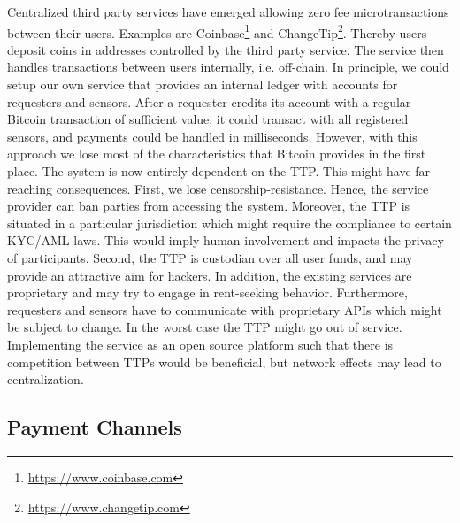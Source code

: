 Centralized third party services have emerged allowing zero fee microtransactions between their users. Examples are Coinbase\footnote{\url{https://www.coinbase.com}} and ChangeTip\footnote{\url{https://www.changetip.com}}. Thereby users deposit coins in addresses controlled by the third party service. The service then handles transactions between users internally, i.e. off-chain. In principle, we could setup our own service that provides an internal ledger with accounts for requesters and sensors. After a requester credits its account with a regular Bitcoin transaction of sufficient value, it could transact with all registered sensors, and payments could be handled in milliseconds. However, with this approach we lose most of the characteristics that Bitcoin provides in the first place. The system is now entirely dependent on the \ac{TTP}. This might have far reaching consequences. First, we lose censorship-resistance. Hence, the service provider can ban parties from accessing the system. Moreover, the \ac{TTP} is situated in a particular jurisdiction which might require the compliance to certain \ac{KYC}/\ac{AML} laws. This would imply human involvement and impacts the privacy of participants. Second, the \ac{TTP} is custodian over all user funds, and may provide an attractive aim for hackers. In addition, the existing services are proprietary and may try to engage in rent-seeking behavior. Furthermore, requesters and sensors have to communicate with proprietary \ac{API}s which might be subject to change. In the worst case the \ac{TTP} might go out of service. Implementing the service as an open source platform such that there is competition between \ac{TTP}s would be beneficial, but network effects may lead to centralization.


\subsection{Payment Channels}
\label{sec:paymentchannels}

